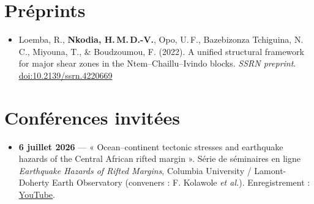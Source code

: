 \documentclass[11pt,a4paper]{article}
\begin{document}
\section{Préprints}
\begin{itemize}
\item Loemba, R., \textbf{Nkodia, H.\,M.\,D.-V.}, Opo, U.\,F., Bazebizonza Tchiguina, N.\,C., Miyouna, T., \& Boudzoumou, F. (2022). A unified structural framework for major shear zones in the Ntem–Chaillu–Ivindo blocks. \emph{SSRN preprint}. \href{https://doi.org/10.2139/ssrn.4220669}{doi:10.2139/ssrn.4220669}
\end{itemize}

\section{Conférences invitées}
\begin{itemize}
\item \textbf{6 juillet 2026} — « Ocean–continent tectonic stresses and earthquake hazards of the Central African rifted margin ». Série de séminaires en ligne \emph{Earthquake Hazards of Rifted Margins}, Columbia University / Lamont-Doherty Earth Observatory (conveners : F. Kolawole \emph{et al.}). Enregistrement : \href{https://www.youtube.com/watch?v=lnRf0Jz0QbM}{YouTube}.
\end{itemize}
\end{document}
